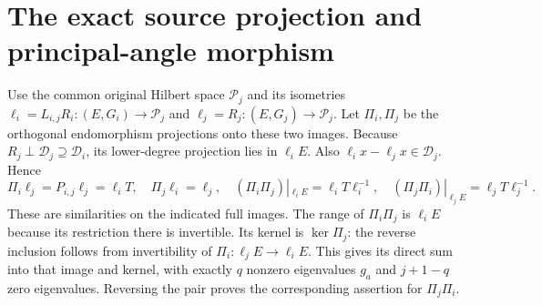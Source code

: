 \documentclass[11pt]{article}
\begin{document}
\section{The exact source projection and principal-angle morphism}
Use the common original Hilbert space $\mathcal P_j$ and its isometries
$\ell_i=L_{i,j}R_i:(E,G_i)\to\mathcal P_j$ and
$\ell_j=R_j:(E,G_j)\to\mathcal P_j$. Let $\Pi_i,\Pi_j$ be the
orthogonal endomorphism projections onto these two images. Because
$R_j\perp\mathcal D_j\supseteq\mathcal D_i$, its lower-degree
projection lies in $\ell_iE$. Also $\ell_ix-\ell_jx\in\mathcal D_j$.
Hence
\[
 \Pi_i\ell_j=P_{i,j}\ell_j=\ell_iT,\quad
 \Pi_j\ell_i=\ell_j,\quad
 (\Pi_i\Pi_j)|_{\ell_iE}=\ell_iT\ell_i^{-1},\quad
 (\Pi_j\Pi_i)|_{\ell_jE}=\ell_jT\ell_j^{-1}.\tag{ERJ.9}
\]
These are similarities on the indicated full images. The range of
$\Pi_i\Pi_j$ is $\ell_iE$ because its restriction there is invertible.
Its kernel is $\ker\Pi_j$: the reverse inclusion follows from
invertibility of $\Pi_i:\ell_jE\to\ell_iE$. This gives its direct
sum into that image and kernel, with exactly $q$ nonzero eigenvalues
$g_a$ and $j+1-q$ zero eigenvalues. Reversing the pair proves the
corresponding assertion for $\Pi_j\Pi_i$.
\end{document}
